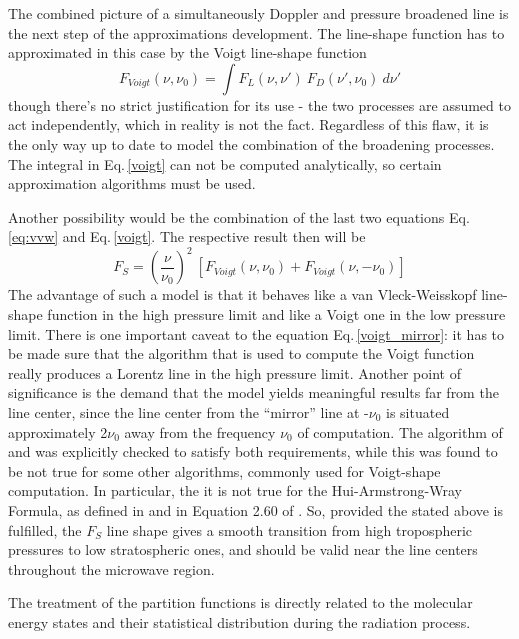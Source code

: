 The combined picture of a simultaneously Doppler and pressure
broadened line is the next step of the approximations development. The
line-shape function has to approximated in this case by the Voigt line-shape
function 
\begin{equation}\label{voigt}
 F_{Voigt}(\nu,\nu_0)= \int F_L(\nu,\nu')~F_D(\nu',\nu_0)~d\nu'
\end{equation}
though there's no strict justification for its use - the two processes
are assumed to act independently, which in reality is not the
fact. Regardless of this flaw, it is the only way up to date to model
the combination of the broadening processes. The integral in Eq.\,\ref{voigt}
can not be computed analytically, so certain approximation algorithms
must be used.


Another possibility would be the combination of the last two equations
Eq.\,\ref{eq:vvw} and Eq.\,\ref{voigt}. The respective result then will be 
\begin{equation}\label{voigt_mirror}
 F_S=\left(\frac{\nu}{\nu_0}\right)^2~[F_{Voigt}(\nu,\nu_0)+F_{Voigt}(\nu,-\nu_0)]
\end{equation}
The advantage of such a model is that it behaves like a van
Vleck-Weisskopf line-shape function in the high pressure limit and
like a Voigt one in the low pressure limit. There is one important
caveat to the equation Eq.\,\ref{voigt_mirror}: it has to be made sure that the
algorithm that is used to compute the Voigt function really produces a
Lorentz line in the high pressure limit. Another point of significance
is the demand that the model yields meaningful results far from the
line center, since the line center from the ``mirror'' line at
-$\nu_0$ is situated approximately 2$\nu_0$ away from the frequency
$\nu_0$ of computation. The algorithm of \citet{Drayson:76} and
\citet{Oliveiro:77} was explicitly checked to satisfy both
requirements, while this was found to be not true for some other
algorithms, commonly used for Voigt-shape computation. In particular,
the it is not true for the Hui-Armstrong-Wray Formula, as defined in
\citet{hui:78} and in Equation 2.60 of \citet{pwr:93}. So, provided
the stated above is fulfilled, the $F_S$ line shape gives a smooth
transition from high tropospheric pressures to low stratospheric ones,
and should be valid near the line centers throughout the microwave region.







The treatment of the partition functions is directly related to the molecular
energy states and their statistical distribution during the
radiation process. 

